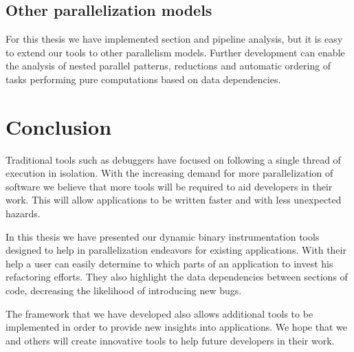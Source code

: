 \subsection{Other parallelization models}

For this thesis we have implemented section and pipeline analysis, but it is easy to extend our tools to other parallelism models. Further development can enable the analysis of nested parallel patterns, reductions and automatic ordering of tasks performing pure computations based on data dependencies.

\section{Conclusion}

Traditional tools such as debuggers have focused on following a single thread of execution in isolation. With the increasing demand for more parallelization of software we believe that more tools will be required to aid developers in their work. This will allow applications to be written faster and with less unexpected hazards.

In this thesis we have presented our dynamic binary instrumentation tools designed to help in parallelization endeavors for existing applications. With their help a user can easily determine to which parts of an application to invest his refactoring efforts. They also highlight the data dependencies between sections of code, decreasing the likelihood of introducing new bugs.

The framework that we have developed also allows additional tools to be implemented in order to provide new insights into applications. We hope that we and others will create innovative tools to help future developers in their work.